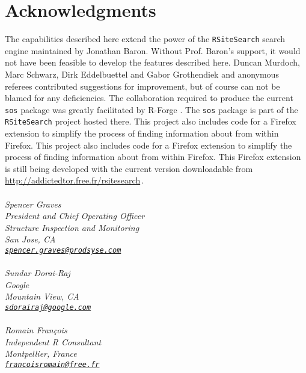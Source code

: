 \section*{Acknowledgments}
The capabilities described here extend the power of the
{\tt RSiteSearch} search engine maintained by Jonathan Baron.
Without Prof. Baron's support, it would not have been feasible
to develop the features described here. Duncan Murdoch, Marc Schwarz,
Dirk Eddelbuettel and Gabor Grothendiek and anonymous
referees contributed suggestions for improvement, but of course
can not be blamed for any deficiencies.  The collaboration
required to produce the current {\tt sos} package was greatly
facilitated by R-Forge \citep{RFORGE09URL}. The {\tt sos} package
is part of the {\tt RSiteSearch} project hosted there.  This project
also includes code for a Firefox extension to simplify the process of
finding information about \R{} from within Firefox.  This project
also includes code for a Firefox extension to simplify the process of
finding information about \R{} from within Firefox.  This Firefox
extension is still being developed with the current version
downloadable from \url{http://addictedtor.free.fr/rsitesearch}\,.
\\ \\
\emph{Spencer Graves \\
President and Chief Operating Officer \\
Structure Inspection and Monitoring \\
San Jose, CA \\
{\tt\href{mailto:spencer.graves@prodsyse.com}{spencer.graves@prodsyse.com}} }
\\ \\
\emph{Sundar Dorai-Raj \\
Google \\
Mountain View, CA \\
{\tt\href{mailto:sdorairaj@google.com}{sdorairaj@google.com}} }
\\ \\
\emph{Romain Fran{\c c}ois \\
Independent R Consultant \\
Montpellier, France \\
{\tt\href{mailto:francoisromain@free.fr}{francoisromain@free.fr}} }
